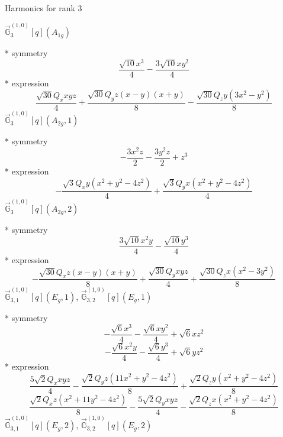 \documentclass[fleqn,8pt]{jsarticle}
\begin{document}
\noindent * Harmonics for rank 3

\noindent\quad $\vec{\mathbb{G}}_{3}^{(1,0)}[q](A_{1g})$

\noindent\quad ** symmetry
\begin{dmath*}
\frac{\sqrt{10} x^{3}}{4} - \frac{3 \sqrt{10} x y^{2}}{4}
\end{dmath*}
\noindent\quad ** expression
\begin{dmath*}
\frac{\sqrt{30} Q_{x} x y z}{4} + \frac{\sqrt{30} Q_{y} z \left(x - y\right) \left(x + y\right)}{8} - \frac{\sqrt{30} Q_{z} y \left(3 x^{2} - y^{2}\right)}{8}
\end{dmath*}
\noindent\quad $\vec{\mathbb{G}}_{3}^{(1,0)}[q](A_{2g},1)$

\noindent\quad ** symmetry
\begin{dmath*}
- \frac{3 x^{2} z}{2} - \frac{3 y^{2} z}{2} + z^{3}
\end{dmath*}
\noindent\quad ** expression
\begin{dmath*}
- \frac{\sqrt{3} Q_{x} y \left(x^{2} + y^{2} - 4 z^{2}\right)}{4} + \frac{\sqrt{3} Q_{y} x \left(x^{2} + y^{2} - 4 z^{2}\right)}{4}
\end{dmath*}
\noindent\quad $\vec{\mathbb{G}}_{3}^{(1,0)}[q](A_{2g},2)$

\noindent\quad ** symmetry
\begin{dmath*}
\frac{3 \sqrt{10} x^{2} y}{4} - \frac{\sqrt{10} y^{3}}{4}
\end{dmath*}
\noindent\quad ** expression
\begin{dmath*}
- \frac{\sqrt{30} Q_{x} z \left(x - y\right) \left(x + y\right)}{8} + \frac{\sqrt{30} Q_{y} x y z}{4} + \frac{\sqrt{30} Q_{z} x \left(x^{2} - 3 y^{2}\right)}{8}
\end{dmath*}
\noindent\quad $\vec{\mathbb{G}}_{3,1}^{(1,0)}[q](E_{g},1)$, $\vec{\mathbb{G}}_{3,2}^{(1,0)}[q](E_{g},1)$

\noindent\quad ** symmetry
\begin{dmath*}
- \frac{\sqrt{6} x^{3}}{4} - \frac{\sqrt{6} x y^{2}}{4} + \sqrt{6} x z^{2}
\end{dmath*}
\begin{dmath*}
- \frac{\sqrt{6} x^{2} y}{4} - \frac{\sqrt{6} y^{3}}{4} + \sqrt{6} y z^{2}
\end{dmath*}
\noindent\quad ** expression
\begin{dmath*}
\frac{5 \sqrt{2} Q_{x} x y z}{4} - \frac{\sqrt{2} Q_{y} z \left(11 x^{2} + y^{2} - 4 z^{2}\right)}{8} + \frac{\sqrt{2} Q_{z} y \left(x^{2} + y^{2} - 4 z^{2}\right)}{8}
\end{dmath*}
\begin{dmath*}
\frac{\sqrt{2} Q_{x} z \left(x^{2} + 11 y^{2} - 4 z^{2}\right)}{8} - \frac{5 \sqrt{2} Q_{y} x y z}{4} - \frac{\sqrt{2} Q_{z} x \left(x^{2} + y^{2} - 4 z^{2}\right)}{8}
\end{dmath*}
\noindent\quad $\vec{\mathbb{G}}_{3,1}^{(1,0)}[q](E_{g},2)$, $\vec{\mathbb{G}}_{3,2}^{(1,0)}[q](E_{g},2)$
\end{document}
